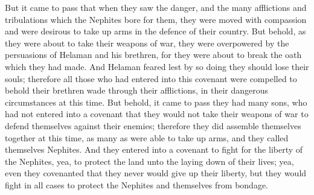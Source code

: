 But it came to pass that when they saw the danger, and the many afflictions and tribulations which the Nephites bore for them, they were moved with compassion and were desirous to take up arms in the defence of their country.
\bverse \iffalse But behold, as they were about to take their weapons of war, they were overpowered by the persuasions of Helaman and his brethren, for they were about to break the oath which they had made. \fi
But behold, as they were about to take their weapons of war, they were overpowered by the persuasions of Helaman and his brethren, for they were about to break the oath which they had made.
\bverse \iffalse And Helaman feared lest by so doing they should lose their souls; therefore all those who had entered into this covenant were compelled to behold their brethren wade through their afflictions, in their dangerous circumstances at this time. \fi
And Helaman feared lest by so doing they should lose their souls; therefore all those who had entered into this covenant were compelled to behold their brethren wade through their afflictions, in their dangerous circumstances at this time.
\bverse \iffalse But behold, it came to pass they had many sons, who had not entered into a covenant that they would not take their weapons of war to defend themselves against their enemies; therefore they did assemble themselves together at this time, as many as were able to take up arms, and they called themselves Nephites. \fi
But behold, it came to pass they had many sons, who had not entered into a covenant that they would not take their weapons of war to defend themselves against their enemies; therefore they did assemble themselves together at this time, as many as were able to take up arms, and they called themselves Nephites.
\bverse \iffalse And they entered into a covenant to fight for the liberty of the Nephites, yea, to protect the land unto the laying down of their lives; yea, even they covenanted that they never would give up their liberty, but they would fight in all cases to protect the Nephites and themselves from bondage. \fi
And they entered into a covenant to fight for the liberty of the Nephites, yea, to protect the land unto the laying down of their lives; yea, even they covenanted that they never would give up their liberty, but they would fight in all cases to protect the Nephites and themselves from bondage.
\bverse \iffalse Now behold, there were two thousand of those young men, who entered into this covenant and took their weapons of war to defend their country. \fi
